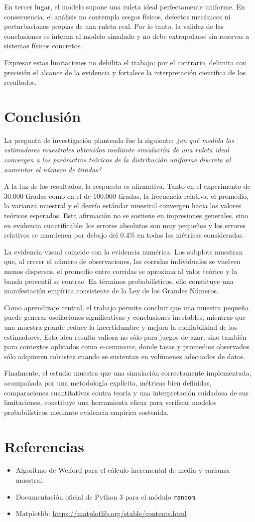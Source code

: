 \documentclass{article}
\begin{document}
En tercer lugar, el modelo supone una ruleta ideal perfectamente uniforme. En consecuencia, el análisis no contempla sesgos físicos, defectos mecánicos ni perturbaciones propias de una ruleta real. Por lo tanto, la validez de las conclusiones es interna al modelo simulado y no debe extrapolarse sin reservas a sistemas físicos concretos.

Expresar estas limitaciones no debilita el trabajo; por el contrario, delimita con precisión el alcance de la evidencia y fortalece la interpretación científica de los resultados.

\section{Conclusión}
La pregunta de investigación planteada fue la siguiente: \textit{¿en qué medida los estimadores muestrales obtenidos mediante simulación de una ruleta ideal convergen a los parámetros teóricos de la distribución uniforme discreta al aumentar el número de tiradas?}

A la luz de los resultados, la respuesta es afirmativa. Tanto en el experimento de 30.000 tiradas como en el de 100.000 tiradas, la frecuencia relativa, el promedio, la varianza muestral y el desvío estándar muestral convergen hacia los valores teóricos esperados. Esta afirmación no se sostiene en impresiones generales, sino en evidencia cuantificable: los errores absolutos son muy pequeños y los errores relativos se mantienen por debajo del 0.4\% en todas las métricas consideradas.

La evidencia visual coincide con la evidencia numérica. Los subplots muestran que, al crecer el número de observaciones, las corridas individuales se vuelven menos dispersas, el promedio entre corridas se aproxima al valor teórico y la banda percentil se contrae. En términos probabilísticos, ello constituye una manifestación empírica consistente de la Ley de los Grandes Números.

Como aprendizaje central, el trabajo permite concluir que una muestra pequeña puede generar oscilaciones significativas y conclusiones inestables, mientras que una muestra grande reduce la incertidumbre y mejora la confiabilidad de los estimadores. Esta idea resulta valiosa no sólo para juegos de azar, sino también para contextos aplicados como \textit{e-commerce}, donde tasas y promedios observados sólo adquieren robustez cuando se sustentan en volúmenes adecuados de datos.

Finalmente, el estudio muestra que una simulación correctamente implementada, acompañada por una metodología explícita, métricas bien definidas, comparaciones cuantitativas contra teoría y una interpretación cuidadosa de sus limitaciones, constituye una herramienta eficaz para verificar modelos probabilísticos mediante evidencia empírica sostenida.

\section{Referencias}
\begin{itemize}
    \item Algoritmo de Welford para el cálculo incremental de media y varianza muestral.
    \item Documentación oficial de Python 3 para el módulo \texttt{random}.
    \item Matplotlib: \url{https://matplotlib.org/stable/contents.html}
\end{itemize}
\end{document}
